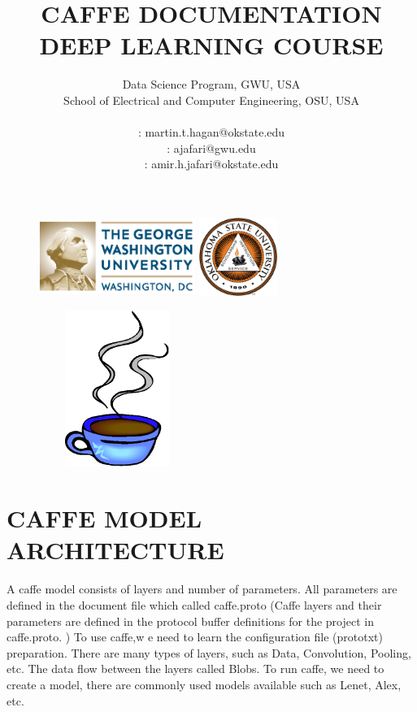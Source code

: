 \documentclass[12pt]{article}
\title{\textbf{\huge{CAFFE DOCUMENTATION}} \\ DEEP LEARNING COURSE}%
\author{Data Science Program, GWU, USA \\
School of Electrical and Computer Engineering, OSU, USA\\
\vspace{1cm}\\
\Letter : martin.t.hagan@okstate.edu\\
\Letter : ajafari@gwu.edu\\
\Letter : amir.h.jafari@okstate.edu  }
\begin{document}
\begin{figure}
\centering \includegraphics[width=2in, height=1in]{fig/GW_logo.eps}\hfill
\centering \includegraphics[width=1in, height=1in]{fig/logo1.eps}\hfill
\end{figure}

\begin{figure}
\centering \includegraphics[width=2in, height=2in]{fig/caffe.eps}                                     %
\end{figure}

\maketitle
\newpage
\tableofcontents
\newpage
\listoffigures
\newpage
\listoftables
\newpage

\section{CAFFE MODEL ARCHITECTURE} \label{CAFFE MODEL ARCHITECTURE}

A caffe model consists of layers and number of parameters. All parameters are defined in the document file which called caffe.proto (Caffe layers and their parameters are defined in the protocol buffer definitions for the project in caffe.proto. \cite{Berkeley}) To use caffe,w e need to learn the configuration file (prototxt) preparation. There are many types of layers, such as Data, Convolution, Pooling, etc. The data flow between the layers called Blobs. To run caffe, we need to create a model, there are  commonly used models available such as  Lenet, Alex, etc.
\end{document}
